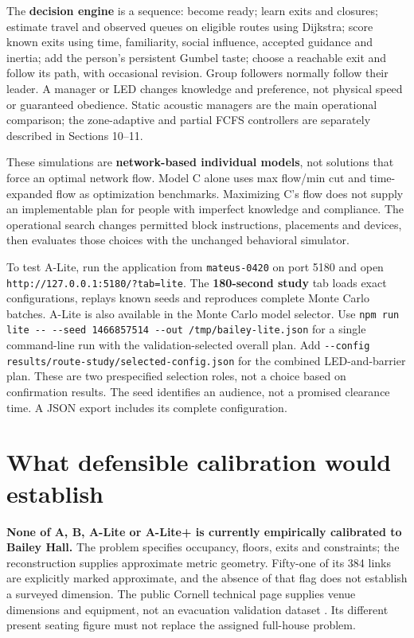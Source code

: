 \documentclass[11pt,a4paper]{article}
\newcommand{\code}[1]{{\small\nolinkurl{#1}}}
\begin{document}
The \textbf{decision engine} is a sequence: become ready; learn exits and closures; estimate travel and observed queues on eligible routes using Dijkstra; score known exits using time, familiarity, social influence, accepted guidance and inertia; add the person's persistent Gumbel taste; choose a reachable exit and follow its path, with occasional revision. Group followers normally follow their leader. A manager or LED changes knowledge and preference, not physical speed or guaranteed obedience. Static acoustic managers are the main operational comparison; the zone-adaptive and partial FCFS controllers are separately described in Sections 10–11.


These simulations are \textbf{network-based individual models}, not solutions that force an optimal network flow. Model C alone uses max flow/min cut and time-expanded flow as optimization benchmarks. Maximizing C's flow does not supply an implementable plan for people with imperfect knowledge and compliance. The operational search changes permitted block instructions, placements and devices, then evaluates those choices with the unchanged behavioral simulator.


To test A-Lite, run the application from \code{mateus-0420} on port 5180 and open \code{http://127.0.0.1:5180/?tab=lite}. The \textbf{180-second study} tab loads exact configurations, replays known seeds and reproduces complete Monte Carlo batches. A-Lite is also available in the Monte Carlo model selector. Use \code{npm run lite -- --seed 1466857514 --out /tmp/bailey-lite.json} for a single command-line run with the validation-selected overall plan. Add \code{--config results/route-study/selected-config.json} for the combined LED-and-barrier plan. These are two prespecified selection roles, not a choice based on confirmation results. The seed identifies an audience, not a promised clearance time. A JSON export includes its complete configuration.


\section{What defensible calibration would establish}\label{sec:23}

\textbf{None of A, B, A-Lite or A-Lite+ is currently empirically calibrated to Bailey Hall.} The problem specifies occupancy, floors, exits and constraints; the reconstruction supplies approximate metric geometry. Fifty-one of its 384 links are explicitly marked approximate, and the absence of that flag does not establish a surveyed dimension. The public Cornell technical page supplies venue dimensions and equipment, not an evacuation validation dataset \cite{R15}. Its different present seating figure must not replace the assigned full-house problem.
\end{document}
